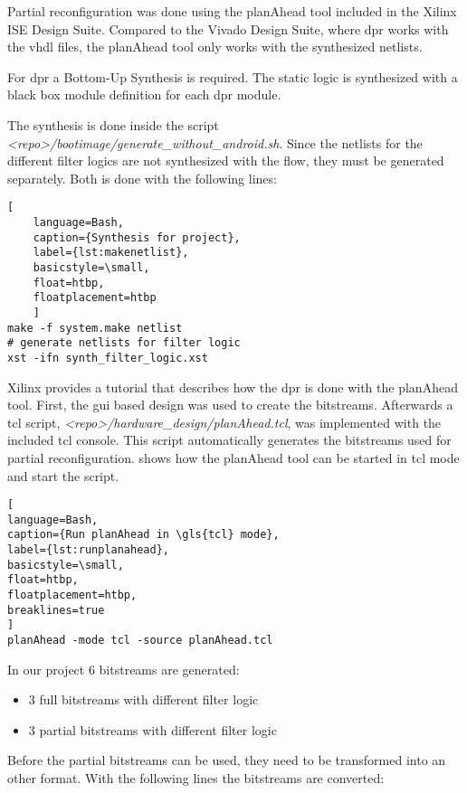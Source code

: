 Partial reconfiguration was done using the planAhead tool included in the Xilinx ISE Design Suite. Compared to the Vivado Design Suite, where \gls{dpr} works with the \gls{vhdl} files, the planAhead tool only works with the synthesized netlists.

For \gls{dpr} a Bottom-Up Synthesis is required. The static logic is synthesized with a black box module definition for each \gls{dpr} module.

The synthesis is done inside the script\\\emph{<repo>/bootimage/generate\_without\_android.sh}. Since the netlists for the different filter logics are not synthesized with the flow, they must be generated separately. Both is done with the following lines: 

\begin{lstlisting}[
	language=Bash,
	caption={Synthesis for project},
	label={lst:makenetlist},
	basicstyle=\small,
	float=htbp,
	floatplacement=htbp
	]
make -f system.make netlist
# generate netlists for filter logic
xst -ifn synth_filter_logic.xst
\end{lstlisting}

Xilinx provides a tutorial \cite{planAheadTutorial} that describes how the \gls{dpr} is done with the planAhead tool. First, the \gls{gui} based design was used to create the bitstreams. Afterwards a \gls{tcl} script, \emph{<repo>/hardware_design/planAhead.tcl}, was implemented with the included \gls{tcl} console. This script automatically generates the bitstreams used for partial reconfiguration.  shows how the planAhead tool can be started in \gls{tcl} mode and start the script.

\begin{lstlisting}[
language=Bash,
caption={Run planAhead in \gls{tcl} mode},
label={lst:runplanahead},
basicstyle=\small,
float=htbp,
floatplacement=htbp,
breaklines=true
]
planAhead -mode tcl -source planAhead.tcl
\end{lstlisting}

In our project $6$ bitstreams are generated:
\begin{itemize}
	\item $3$ full bitstreams with different filter logic
	\item $3$ partial bitstreams with different filter logic
\end{itemize}

Before the partial bitstreams can be used, they need to be transformed into an other format. With the following lines the bitstreams are converted:

